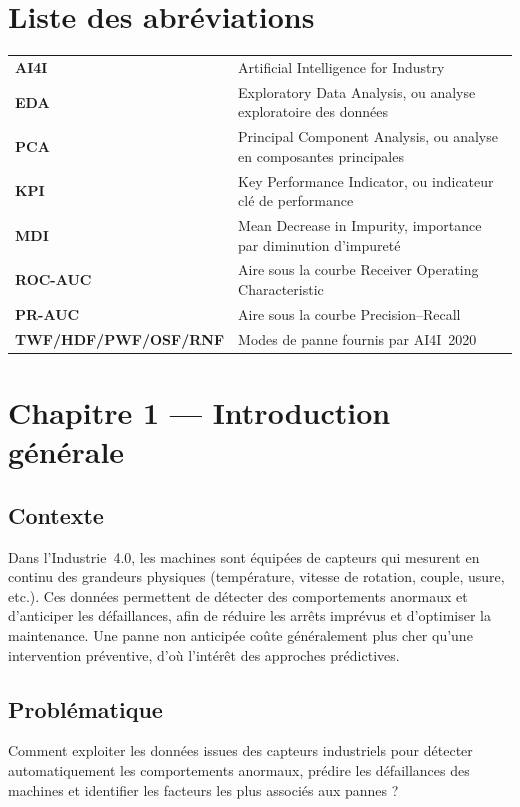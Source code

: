 \documentclass[12pt,a4paper]{article}
\begin{document}
\section*{Liste des abréviations}
\begin{tabularx}{\textwidth}{@{}l X@{}}
\textbf{AI4I} & Artificial Intelligence for Industry \\
\textbf{EDA} & Exploratory Data Analysis, ou analyse exploratoire des données \\
\textbf{PCA} & Principal Component Analysis, ou analyse en composantes principales \\
\textbf{KPI} & Key Performance Indicator, ou indicateur clé de performance \\
\textbf{MDI} & Mean Decrease in Impurity, importance par diminution d'impureté \\
\textbf{ROC-AUC} & Aire sous la courbe Receiver Operating Characteristic \\
\textbf{PR-AUC} & Aire sous la courbe Precision--Recall \\
\textbf{TWF/HDF/PWF/OSF/RNF} & Modes de panne fournis par AI4I~2020 \\
\end{tabularx}
\newpage

\section{Chapitre 1 — Introduction générale}

\subsection{Contexte}
Dans l'Industrie~4.0, les machines sont équipées de capteurs qui mesurent en continu des grandeurs physiques (température, vitesse de rotation, couple, usure, etc.). Ces données permettent de détecter des comportements anormaux et d'anticiper les défaillances, afin de réduire les arrêts imprévus et d'optimiser la maintenance. Une panne non anticipée coûte généralement plus cher qu'une intervention préventive, d'où l'intérêt des approches prédictives.

\subsection{Problématique}
Comment exploiter les données issues des capteurs industriels pour détecter automatiquement les comportements anormaux, prédire les défaillances des machines et identifier les facteurs les plus associés aux pannes ?
\end{document}
